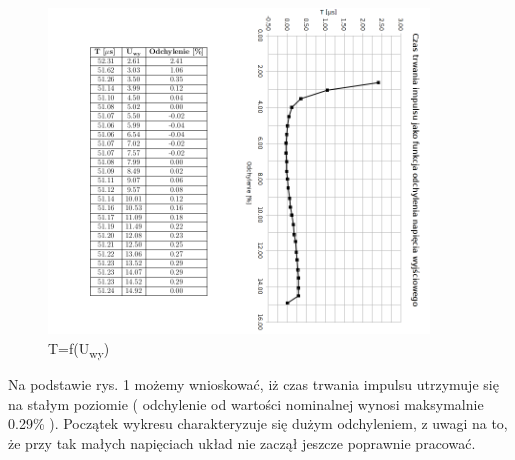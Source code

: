 \documentclass[a4paper,12pt]{article}
\begin{document}
\begin{figure}[h]
  \center 
  \includegraphics[width=0.9\textwidth]{tab}
  \caption{T=f(U\textsubscript{wy})}
\end{figure}
Na podstawie rys. 1 możemy wnioskować, iż czas trwania impulsu utrzymuje się na stałym poziomie ( odchylenie od wartości nominalnej wynosi maksymalnie 0.29\% ). Początek wykresu charakteryzuje się dużym odchyleniem, z uwagi na to, że przy tak małych napięciach układ nie zaczął jeszcze poprawnie pracować.
\pagebreak
\end{document}
